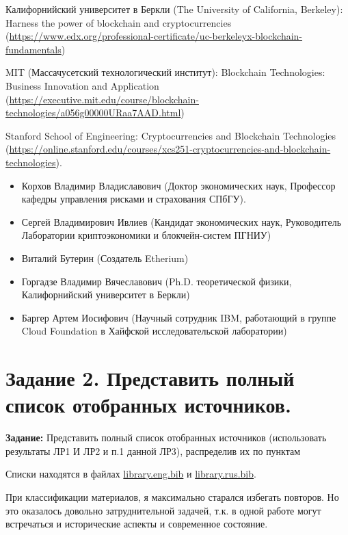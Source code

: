 \documentclass[a4paper, 12pt]{report}		%
\begin{document}
Калифорнийский университет в Беркли (The University of California, Berkeley): Harness the power of blockchain and cryptocurrencies (\url{https://www.edx.org/professional-certificate/uc-berkeleyx-blockchain-fundamentals})

MIT (Массачусетский технологический институт): Blockchain Technologies: Business Innovation and Application (\url{https://executive.mit.edu/course/blockchain-technologies/a056g00000URaa7AAD.html})

Stanford School of Engineering: Cryptocurrencies and Blockchain Technologies (\url{https://online.stanford.edu/courses/xcs251-cryptocurrencies-and-blockchain-technologies}).

\begin{itemize}
\item Корхов Владимир Владиславович (Доктор экономических наук, Профессор кафедры управления рисками и страхования СПбГУ).
\item Сергей Владимирович Ивлиев (Кандидат экономических наук, Руководитель Лаборатории криптоэкономики и блокчейн-систем ПГНИУ)
\item Виталий Бутерин (Создатель Etherium)
\item Горгадзе Владимир Вячеславович (Ph.D. теоретической физики, Калифорнийский университет в Беркли)
\item Баргер Артем Иосифович (Научный сотрудник IBM, работающий в группе Cloud Foundation в Хайфской исследовательской лаборатории)
\end{itemize}

\chapter*{Задание 2. Представить полный список отобранных источников.}

\textbf{Задание:} Представить полный список отобранных источников (использовать результаты ЛР1 И ЛР2 и п.1 данной ЛР3), распределив их по пунктам

Списки находятся в файлах \href{https://raw.githubusercontent.com/SemenMartynov/SPbPU_DigitalResources/main/Practice2/res/library.eng.bib}{library.eng.bib} и \href{https://raw.githubusercontent.com/SemenMartynov/SPbPU_DigitalResources/main/Practice2/res/library.rus.bib}{library.rus.bib}.

При классификации материалов, я максимально старался избегать повторов. Но это оказалось довольно затруднительной задачей, т.к. в одной работе могут встречаться и исторические аспекты и современное состояние.
\end{document}
